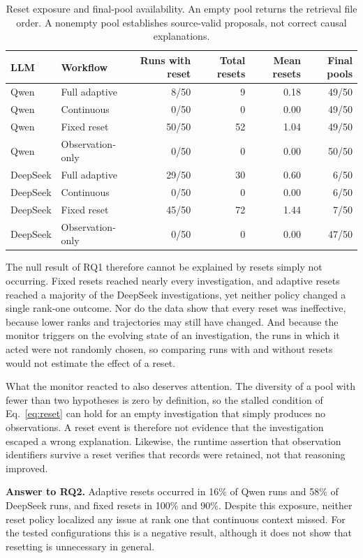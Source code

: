 \documentclass[a4paper,fleqn]{cas-sc}
\begin{document}
\begin{table}[pos=!htbp]
\caption{Reset exposure and final-pool availability. An empty pool returns the retrieval file order. A nonempty pool establishes source-valid proposals, not correct causal explanations.}\label{tab:eval-mechanisms}
\centering\small
\begin{tabular*}{\textwidth}{@{\extracolsep{\fill}}llrrrr@{}}\toprule
LLM & Workflow & Runs with reset & Total resets & Mean resets & Final pools\\\midrule
Qwen & Full adaptive & 8/50 & 9 & 0.18 & 49/50\\
Qwen & Continuous & 0/50 & 0 & 0.00 & 49/50\\
Qwen & Fixed reset & 50/50 & 52 & 1.04 & 49/50\\
Qwen & Observation-only & 0/50 & 0 & 0.00 & 50/50\\
\midrule
DeepSeek & Full adaptive & 29/50 & 30 & 0.60 & 6/50\\
DeepSeek & Continuous & 0/50 & 0 & 0.00 & 6/50\\
DeepSeek & Fixed reset & 45/50 & 72 & 1.44 & 7/50\\
DeepSeek & Observation-only & 0/50 & 0 & 0.00 & 47/50\\
\bottomrule\end{tabular*}
\end{table}

The null result of RQ1 therefore cannot be explained by resets simply not occurring. Fixed resets reached nearly every investigation, and adaptive resets reached a majority of the DeepSeek investigations, yet neither policy changed a single rank-one outcome. Nor do the data show that every reset was ineffective, because lower ranks and trajectories may still have changed. And because the monitor triggers on the evolving state of an investigation, the runs in which it acted were not randomly chosen, so comparing runs with and without resets would not estimate the effect of a reset.

What the monitor reacted to also deserves attention. The diversity of a pool with fewer than two hypotheses is zero by definition, so the stalled condition of Eq.~\eqref{eq:reset} can hold for an empty investigation that simply produces no observations. A reset event is therefore not evidence that the investigation escaped a wrong explanation. Likewise, the runtime assertion that observation identifiers survive a reset verifies that records were retained, not that reasoning improved.

\noindent\textbf{Answer to RQ2.} Adaptive resets occurred in 16\% of Qwen runs and 58\% of DeepSeek runs, and fixed resets in 100\% and 90\%. Despite this exposure, neither reset policy localized any issue at rank one that continuous context missed. For the tested configurations this is a negative result, although it does not show that resetting is unnecessary in general.
\end{document}
